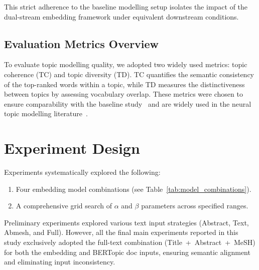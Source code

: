 \documentclass[authorproof,JACIII,researchpaper]{fujipressarticle}
\begin{document}
This strict adherence to the baseline modelling setup isolates the impact of the dual-stream embedding framework under equivalent downstream conditions.

\subsection{Evaluation Metrics Overview}
To evaluate topic modelling quality, we adopted two widely used metrics: topic coherence (TC) and topic diversity (TD). TC quantifies the semantic consistency of the top-ranked words within a topic, while TD measures the distinctiveness between topics by assessing vocabulary overlap. These metrics were chosen to ensure comparability with the baseline study~\cite{lezhnina_depression_2023} and are widely used in the neural topic modelling literature~\cite{dieng_topic_2020,mimno_optimizing_2011,roder_exploring_2015}.


\section{Experiment Design}
Experiments systematically explored the following:
\begin{enumerate}[leftmargin=*,label=\arabic*)]
    \item Four embedding model combinations (see Table~\ref{tab:model_combinations}).
    \item A comprehensive grid search of $\alpha$ and $\beta$ parameters across specified ranges.
\end{enumerate}

Preliminary experiments explored various text input strategies (Abstract, Text, Abmesh, and Full). However, all the final main experiments reported in this study exclusively adopted the full-text combination (Title~+~Abstract~+~MeSH) for both the embedding and BERTopic doc inputs, ensuring semantic alignment and eliminating input inconsistency.
\end{document}
